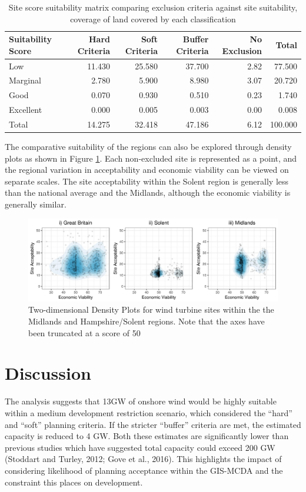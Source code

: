 \documentclass[a4paper,]{article}
\theoremstyle{definition}
\theoremstyle{definition}
\theoremstyle{remark}
\begin{document}
{\begin{table}
\caption{\label{tab:ScoreMatrix}Site score suitability matrix comparing exclusion criteria against site suitability, coverage of land covered by each classification}
\centering
\begin{tabular}[t]{lrrrrr}
\toprule
Suitability Score & Hard Criteria & Soft Criteria & Buffer Criteria & No Exclusion & Total\\
\midrule
Low & 11.430 & 25.580 & 37.700 & 2.82 & 77.500\\
Marginal & 2.780 & 5.900 & 8.980 & 3.07 & 20.720\\
Good & 0.070 & 0.930 & 0.510 & 0.23 & 1.740\\
Excellent & 0.000 & 0.005 & 0.003 & 0.00 & 0.008\\
Total & 14.275 & 32.418 & 47.186 & 6.12 & 100.000\\
\bottomrule
\end{tabular}
\end{table}

The comparative suitability of the regions can also be explored through
density plots as shown in Figure \ref{fig:DensityPlot}. Each
non-excluded site is represented as a point, and the regional variation
in acceptability and economic viability can be viewed on separate
scales. The site acceptability within the Solent region is generally
less than the national average and the Midlands, although the economic
viability is generally similar.

\begin{figure}[!h]
\includegraphics[width=1\linewidth]{figures/DensityPlots} \caption{Two-dimensional Density Plots for wind turbine sites within the the Midlands and Hampshire/Solent regions. Note that the axes have been truncated at a score of 50}\label{fig:DensityPlot}
\end{figure}

\section{Discussion}\label{discussion}

The analysis suggests that 13GW of onshore wind would be highly suitable
within a medium development restriction scenario, which considered the
``hard'' and ``soft'' planning criteria. If the stricter ``buffer''
criteria are met, the estimated capacity is reduced to 4 GW. Both these
estimates are significantly lower than previous studies which have
suggested total capacity could exceed 200 GW (Stoddart and Turley, 2012;
Gove et al., 2016). This highlights the impact of considering likelihood
of planning acceptance within the GIS-MCDA and the constraint this
places on development.

}
\end{document}

